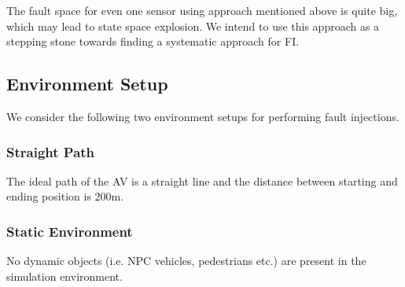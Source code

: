 The fault space for even one sensor using approach mentioned above is quite big, which may lead to state space explosion. We intend to use this approach as a stepping stone towards finding a systematic approach for FI.  

\subsection{Environment Setup}
We consider the following two environment setups for performing fault injections.

\subsubsection{ Straight Path} The ideal path of the AV is a straight line and the distance between starting and ending position is 200m. 

\subsubsection{Static Environment} No dynamic objects (i.e. NPC vehicles, pedestrians etc.) are present in the simulation environment. 